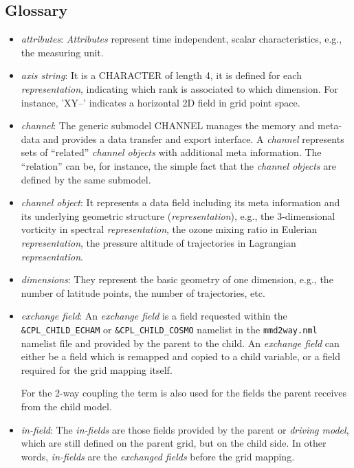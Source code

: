 \documentclass[twoside]{article}
\begin{document}
\begin{appendix}
\section{\noindent Glossary}
\begin{itemize}
\item {\it attributes}: {\it Attributes} represent time independent, scalar 
characteristics, e.g., the measuring unit.
\item {\it axis string}: It is a \footnotesize{CHARACTER} of length 4, it
is defined for each {\it representation}, indicating which rank is associated
to which dimension. For instance, 'XY--' indicates a horizontal 2D field in
grid point space. 
\item {\it channel}: The generic submodel CHANNEL manages the 
memory and meta-data and provides a data transfer and export interface.
A {\it channel} represents sets of ``related'' {\it channel objects}
with additional meta information. The ``relation'' can be, for instance, the 
simple fact that the {\it channel objects} are defined by the same submodel.
\item {\it channel object}: It represents a data field including
its meta information and its underlying
geometric structure ({\it representation}), e.g., the 3-dimensional vorticity in
 spectral {\it representation}, the ozone mixing ratio in Eulerian 
{\it representation}, the pressure altitude of trajectories in Lagrangian 
{\it representation}.
\item {\it dimensions}: They represent the basic geometry of one dimension,
e.g., the number of latitude points, the number of trajectories, etc.
\item {\it exchange field}: An {\it exchange field} is a field requested within 
  the \verb|&CPL_CHILD_ECHAM| or \verb|&CPL_CHILD_COSMO| namelist in
  the \verb|mmd2way.nml| namelist file and provided by the parent to
  the child.  
  An {\it exchange field} can either be a field which is remapped and copied
  to a child variable, or a field required for the 
  grid mapping itself.

  For the 2-way coupling the term is also used for the fields the
  parent receives from the child model.
\item {\it in-field}: The {\it in-fields} are those fields provided by 
  the parent or {\it driving model}, which are still defined on the parent grid,
  but on the child side. In other words, {\it in-fields} are the
  {\it exchanged fields} before the grid mapping.
  

\end{itemize}
\end{appendix}
\end{document}

